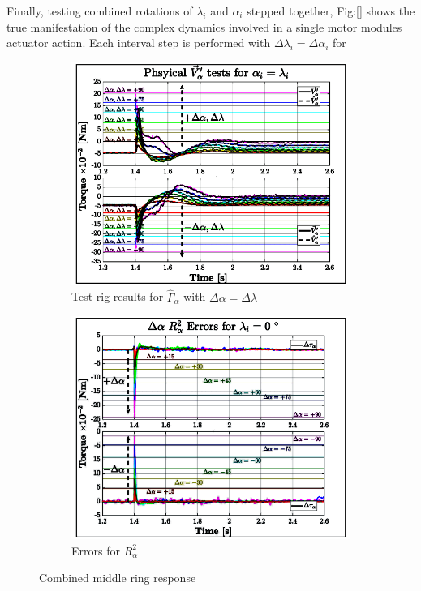 \par
Finally, testing combined rotations of $\lambda_i$ and $\alpha_i$ stepped together, Fig:\ref{} shows the true manifestation of the complex dynamics involved in a single motor modules actuator action. Each interval step is performed with $\Delta\lambda_i=\Delta\alpha_i$ for 
\begin{figure}[htbp]
\centering
\begin{subfigure}{0.49\textwidth}
\centering
\includegraphics[width=\textwidth]{graphs/tau-alph-lam}
\caption{Test rig results for $\hat{\Gamma}_\alpha$ with $\Delta\alpha=\Delta\lambda$}
\label{fig:tau-alpha-lam}
\end{subfigure}
\begin{subfigure}{0.49\textwidth}
\centering
\includegraphics[width=\textwidth]{graphs/tau-alpha-r}
\caption{Errors for $R^2_{\alpha}$}
\label{fig:tau-alpha-lam-r}
\end{subfigure}
\vspace{-8pt}
\caption{Combined middle ring response}
\label{fig:tau-alpha-lam-response-test}
\vspace{-16pt}
\end{figure}
